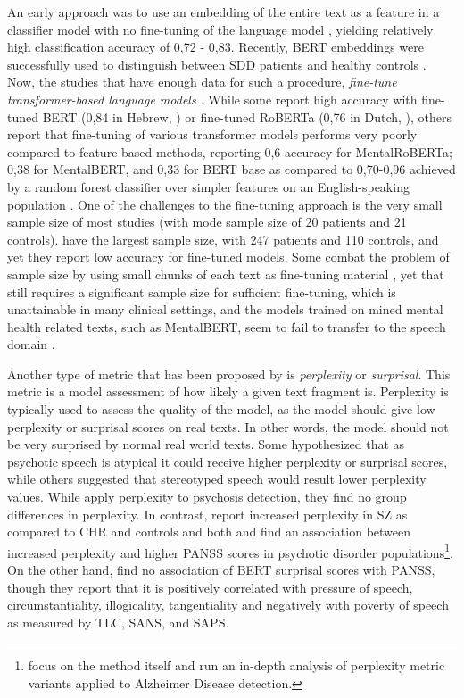 An early approach was to use an embedding of the entire text as a feature in a classifier model with no fine-tuning of the language model \citep{elvevaag2010automated, rosenstein2015language}, yielding relatively high classification accuracy of 0,72 - 0,83. Recently, BERT embeddings were successfully used to distinguish between SDD patients and healthy controls \citep{srivastava2022p473}. Now, the studies that have enough data for such a procedure, \textit{fine-tune transformer-based language models} \citep{wouts2021belabbert, aich2022towards, shriki2022masking}. While some report high accuracy with fine-tuned BERT (0,84 in Hebrew, \cite{shriki2022masking}) or fine-tuned RoBERTa (0,76 in Dutch, \cite{wouts2021belabbert}), others report that fine-tuning of various transformer models performs very poorly compared to feature-based methods, reporting 0,6 accuracy for MentalRoBERTa; 0,38 for MentalBERT, and 0,33 for BERT base as compared to 0,70-0,96 achieved by a random forest classifier over simpler features on an English-speaking population \citep{aich2022towards}. One of the challenges to the fine-tuning approach is the very small sample size of most studies (with mode sample size of 20 patients and 21 controls). \citet{aich2022towards} have the largest sample size, with 247 patients and 110 controls, and yet they report low accuracy for fine-tuned models. Some combat the problem of sample size by using small chunks of each text as fine-tuning material \citep{wouts2021belabbert}, yet that still requires a significant sample size for sufficient fine-tuning, which is unattainable in many clinical settings, and the models trained on mined mental health related texts, such as MentalBERT, seem to fail to transfer to the speech domain \citep{aich2022towards}.

Another type of metric that has been proposed by \citet{mitchell2015quantifying} is \textit{perplexity} or \textit{surprisal}. This metric is a model assessment of how likely a given text fragment is. Perplexity is typically used to assess the quality of the model, as the model should give low perplexity or surprisal scores on real texts. In other words, the model should not be very surprised by normal real world texts. Some hypothesized that as psychotic speech is atypical it could receive higher perplexity or surprisal scores, while others suggested that stereotyped speech would result lower perplexity values. While \citet{mitchell2015quantifying} apply perplexity to psychosis detection, they find no group differences in perplexity. In contrast, \citet{srivastava2022increased} report increased perplexity in SZ as compared to CHR and controls and both \citet{vail2018toward} and \citet{girard2022computational} find an association between increased perplexity and higher PANSS scores in psychotic disorder populations\footnote{\citet{colla2022semantic} focus on the method itself and run an in-depth analysis of perplexity metric variants applied to Alzheimer Disease detection.}. On the other hand, \citet{jeong2023exploring} find no association of BERT surprisal scores with PANSS, though they report that it is positively correlated with pressure of speech, circumstantiality, illogicality, tangentiality and negatively with poverty of speech as measured by TLC, SANS, and SAPS.

